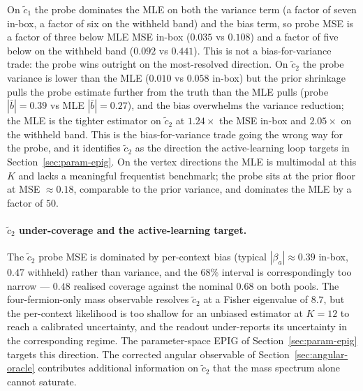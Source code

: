 \documentclass[11pt,a4paper]{article}
\begin{document}
On $\tilde{c}_1$ the probe dominates the MLE on both the variance term (a factor of seven in-box, a factor of six on the withheld band) and the bias term, so probe MSE is a factor of three below MLE MSE in-box ($0.035$ vs $0.108$) and a factor of five below on the withheld band ($0.092$ vs $0.441$). This is not a bias-for-variance trade: the probe wins outright on the most-resolved direction. On $\tilde{c}_2$ the probe variance is lower than the MLE ($0.010$ vs $0.058$ in-box) but the prior shrinkage pulls the probe estimate further from the truth than the MLE pulls (probe $|\bar{b}| = 0.39$ vs MLE $|\bar{b}| = 0.27$), and the bias overwhelms the variance reduction; the MLE is the tighter estimator on $\tilde{c}_2$ at $1.24\times$ the MSE in-box and $2.05\times$ on the withheld band. This is the bias-for-variance trade going the wrong way for the probe, and it identifies $\tilde{c}_2$ as the direction the active-learning loop targets in Section~\ref{sec:param-epig}. On the vertex directions the MLE is multimodal at this $K$ and lacks a meaningful frequentist benchmark; the probe sits at the prior floor at MSE $\approx 0.18$, comparable to the prior variance, and dominates the MLE by a factor of $50$.

\paragraph{$\tilde{c}_2$ under-coverage and the active-learning target.}
The $\tilde{c}_2$ probe MSE is dominated by per-context bias (typical $|\beta_a| \approx 0.39$ in-box, $0.47$ withheld) rather than variance, and the $68\%$ interval is correspondingly too narrow — $0.48$ realised coverage against the nominal $0.68$ on both pools. The four-fermion-only mass observable resolves $\tilde{c}_2$ at a Fisher eigenvalue of $8.7$, but the per-context likelihood is too shallow for an unbiased estimator at $K = 12$ to reach a calibrated uncertainty, and the readout under-reports its uncertainty in the corresponding regime. The parameter-space EPIG of Section~\ref{sec:param-epig} targets this direction. The corrected angular observable of Section~\ref{sec:angular-oracle} contributes additional information on $\tilde{c}_2$ that the mass spectrum alone cannot saturate.
\end{document}
